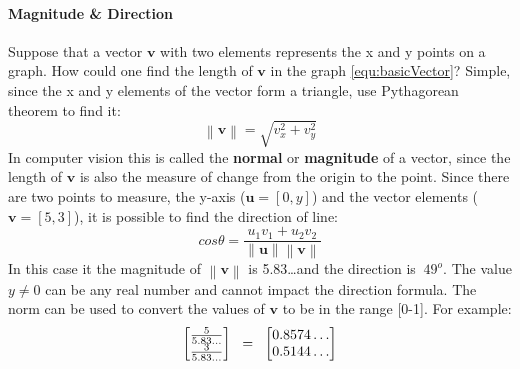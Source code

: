 \documentclass[11pt]{article}
\newcommand{\norm}[1]{\left\lVert#1\right\rVert}
\begin{document}
\paragraph[Magnitude \& Direction]{Magnitude \& Direction}
Suppose that a vector $\textbf{v}$ with two elements represents the x and y points on a graph. How could one find the length of $\textbf{v}$ in the graph \eqref{equ:basicVector}? Simple, since the x and y elements of the vector form a triangle, use Pythagorean theorem to find it:
\begin{equation}\label{equ:VectorNorm}
	\norm{\textbf{v}}=\sqrt{v_{x}^{2}+v_{y}^{2}}
\end{equation}
In computer vision this is called the \textbf{normal} or \textbf{magnitude} of a vector, since the length of $\textbf{v}$ is also the measure of change from the origin to the point. Since there are two points to measure, the y-axis ($\textbf{u}=[0,y]$) and the vector elements ($\textbf{v}=[5,3]$), it is possible to find the direction of line:
\begin{equation}\label{equ:VectorDirection}
cos\theta = \frac{u_{1}v_{1}+u_{2}v_{2}}{\norm{\textbf{u}}\norm{\textbf{v}}}
\end{equation}
In this case it the magnitude of $\norm{\textbf{v}}$ is 5.83\dots and the direction is $~49^{o}$. The value $y\neq0$ can be any real number and cannot impact the direction formula. The norm can be used to convert the values of $\textbf{v}$ to be in the range [0-1]. For example:
{ \small
	\begin{equation}\label{equ:L2Norm}
	\begin{bmatrix}
	\frac{5}{5.83\dots}\\
	\frac{3}{5.83\dots}
	\end{bmatrix}
	\hspace{.2cm}
	=
	\hspace{.2cm}
	\begin{bmatrix}
	0.8574\dots\\
	0.5144\dots
	\end{bmatrix}
	\end{equation}
}
\end{document}
